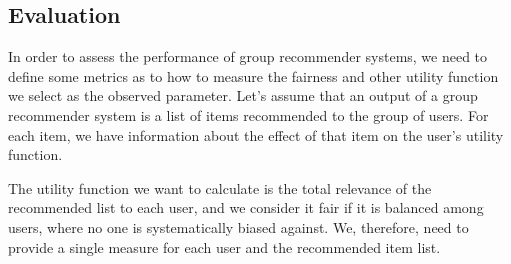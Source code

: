 \begin{itemize}
    
\end{itemize}

\subsection{Evaluation} \label{sec:02_evaluation}

In order to assess the performance of group recommender systems, we need to define some metrics as to how to measure the fairness and other utility function we select as the observed parameter.
Let's assume that an output of a group recommender system is a list of items recommended to the group of users. For each item, we have information about the effect of that item on the user's utility function.

The utility function we want to calculate is the total relevance of the recommended list to each user, and we consider it fair if it is balanced among users, where no one is systematically biased against. We, therefore, need to provide a single measure for each user and the recommended item list.

